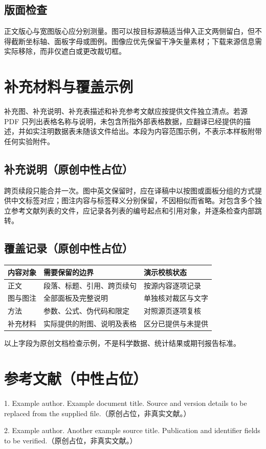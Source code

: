 \documentclass[UTF8,fontset=none,scheme=plain]{ctexart}
\begin{document}
\subsection*{版面检查}
正文版心与宽图版心应分别测量。图可以按目标源稿适当伸入正文两侧留白，但不得截断坐标轴、面板字母或图例。图像应优先保留干净矢量素材；下载来源信息需实际移除，而非仅遮白或更改裁切框。

\clearpage
\section*{补充材料与覆盖示例}
补充图、补充说明、补充表描述和补充参考文献应按提供文件独立清点。若源 PDF 只列出表格名称与说明，未包含所指外部表格数据，应翻译已经提供的描述，并如实注明数据表未随该文件给出。本段为内容范围示例，不表示本样板附带任何实验附件。

\subsection*{补充说明（原创中性占位）}
跨页续段只能合并一次。图中英文保留时，应在译稿中以按图或面板分组的方式提供中文标签对应；图注内容与标签释义分别保留，不因相似而省略。对包含多个独立参考文献列表的文件，应记录各列表的编号起点和引用对象，并逐条检查内部跳转。

\subsection*{覆盖记录（原创中性占位）}
\begin{tabular}{@{}p{}p{}p{}@{}}
\toprule
内容对象 & 需要保留的边界 & 演示校核状态\\\midrule
正文 & 段落、标题、引用、跨页续句 & 按源内容逐项记录\\[4bp]
图与图注 & 全部面板及完整说明 & 单独核对裁区与文字\\[4bp]
方法 & 参数、公式、伪代码和限定 & 对照源页逐项复核\\[4bp]
补充材料 & 实际提供的附图、说明及表格 & 区分已提供与未提供\\[4bp]
\bottomrule
\end{tabular}
\par\smallskip
以上字段为原创文档检查示例，不是科学数据、统计结果或期刊报告标准。

\section*{参考文献（中性占位）}
{\fontsize{8.3bp}{11.3bp}\selectfont
\hypertarget{preprint-ref:1}{}1. Example author. Example document title. Source and version details to be replaced from the supplied file.（原创占位，非真实文献。）\par
\hypertarget{preprint-ref:2}{}2. Example author. Another example source title. Publication and identifier fields to be verified.（原创占位，非真实文献。）\par}
\end{document}
